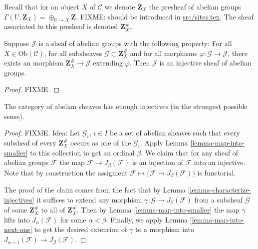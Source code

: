 \noindent
Recall that for an object $X$ of $\mathcal{C}$ we denote $\mathbf{Z}_X$ 
the presheaf of abelian groups $\Gamma(U, \mathbf{Z}_X) = 
\oplus_{U \to X} \mathbf{Z}$. FIXME: should be introduced in
\url{src/sites.tex}. The sheaf associated to this presheaf
is denoted $\mathbf{Z}_X^\#$.

\begin{lemma}
\label{lemma-characterize-injectives}
Suppose $\mathcal{J}$ is a sheaf of abelian groups with the following
property: For all $X\in \text{Ob}(\mathcal{C})$, for all subsheaves
$\mathcal{G} \subset \mathbf{Z}_X^\#$ and for all morphisms
$\varphi : \mathcal{G} \to \mathcal{J}$, there exists an morphism
$\mathbf{Z}_X^\# \to \mathcal{J}$ extending $\varphi$.
Then $\mathcal{J}$ is an injective sheaf of abelian groups.
\end{lemma}

\begin{proof}
FIXME.
\end{proof}

\begin{theorem}
\label{theorem-sheaves-injectives}
The category of abelian sheaves has enough injectives (in the
strongest possible sense).
\end{theorem}

\begin{proof}
FIXME. Idea: Let $\mathcal{G}_i$, $i\in I$ be a set of abelian
sheaves such that every subsheaf of every $\mathbf{Z}_X^\#$
occurs as one of the $\mathcal{G}_i$. Apply
Lemma \ref{lemma-map-into-smaller} to this collection to
get an ordinal $\beta$. We claim that for any sheaf of abelian
groups $\mathcal{F}$ the map $\mathcal{F} \to J_\beta(\mathcal{F})$
is an injection of $\mathcal{F}$ into an injective.
Note that by construction the assigment $\mathcal{F} \mapsto
\big(\mathcal{F} \to J_\beta(\mathcal{F})\big)$ is functorial.

\medskip\noindent
The proof of the claim comes from the fact that by
Lemma \ref{lemma-characterize-injectives} it suffices to extend any
morphism $\gamma : \mathcal{G} \to J_\beta(\mathcal{F})$ 
from a subsheaf $\mathcal{G}$ of some $\mathbf{Z}_X^\#$ to all of
$\mathbf{Z}_X^\#$. Then by Lemma \ref{lemma-map-into-smaller} the
map $\gamma$ lifts into $J_\alpha(\mathcal{F})$ for some
$\alpha < \beta$. Finally, we apply Lemma \ref{lemma-map-into-next-one}
to get the desired extension of $\gamma$ to a morphism
into $J_{\alpha+1}(\mathcal{F}) \to J_\beta(\mathcal{F})$.
\end{proof}

